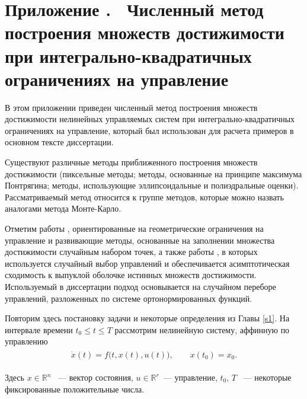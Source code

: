 \documentclass[../main.tex]{subfiles}
\begin{document}
\clearpage
\setcounter{section}{0}%
\renewcommand{\thesection}{\Alph{section}}%
\section*{Приложение .  Численный метод построения множеств достижимости при интегрально-квадратичных ограничениях на управление}%
\label{app:A}%
\renewcommand{\theequation}{\Alph{section}.\arabic{equation}}%
\setcounter{equation}{0}
В этом приложении приведен численный метод построения множеств достижимости нелинейных управляемых систем при интегрально-квадратичных ограничениях на управление, который был использован для расчета примеров в основном тексте диссертации.

Существуют различные методы приближенного построения множеств достижимости (пиксельные методы; методы, основанные на принципе максимума Понтрягина; методы, использующие эллипсоидальные и полиэдральные оценки).
Рассматриваемый метод относится к группе методов, которые можно назвать аналогами метода Монте-Карло. 
 
Отметим работы \cite{Gornov2015, Gornov2017}, ориентированные на геометрические ограничения на управление и развивающие методы, основанные на заполнении множества достижимости случайным набором точек, а также работы \cite{Lew2020, Lew2022}, в которых используется случайный выбор управлений и обеспечивается асимптотическая сходимость к выпуклой оболочке истинных множеств достижимости.
Используемый в диссертации подход основывается на случайном переборе управлений, разложенных по системе ортонормированных функций.

Повторим здесь постановку задачи и некоторые определения из Главы \ref{s1}.
На интервале времени $ t_0 \leqslant t \leqslant {T} $ рассмотрим нелинейную систему, аффинную по управлению
\begin{gather}\label{a1:common_nonlinear}
	\begin{gathered}
		\dot{x}(t)=f\big(t, x(t), u(t)\big), \qquad x(t_0) = x_0.
	\end{gathered}
\end{gather}

Здесь $ x \in \mathbb{R}^n $ ~--- вектор состояния, $ u \in \mathbb{R}^r $~--- управление, $t_0$, $ {T} $ ~--- некоторые фиксированные положительные числа.
\end{document}
